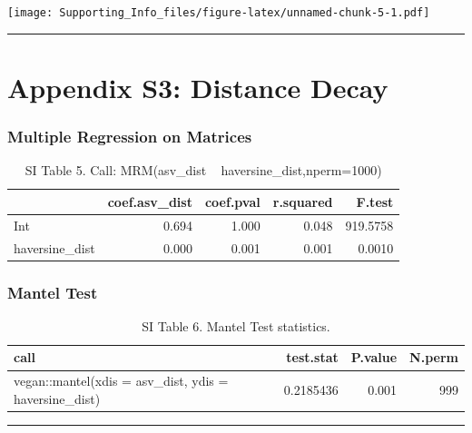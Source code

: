 \documentclass[
]{article}
\begin{document}
\texttt{[image: Supporting\_Info\_files/figure-latex/unnamed-chunk-5-1.pdf]}

\begin{center}\rule{0.5\linewidth}{0.5pt}\end{center}

\hypertarget{appendix-s3-distance-decay}{%
\section{Appendix S3: Distance Decay}\label{appendix-s3-distance-decay}}

\hypertarget{multiple-regression-on-matrices}{%
\subsubsection{Multiple Regression on
Matrices}\label{multiple-regression-on-matrices}}

\begin{table}

\caption{\label{tab:unnamed-chunk-6}SI Table 5. Call: MRM(asv_dist ~ haversine_dist,nperm=1000)}
\centering
\begin{tabular}[t]{l|r|r|r|r}
\hline
  & coef.asv\_dist & coef.pval & r.squared & F.test\\
\hline
Int & 0.694 & 1.000 & 0.048 & 919.5758\\
\hline
haversine\_dist & 0.000 & 0.001 & 0.001 & 0.0010\\
\hline
\end{tabular}
\end{table}

\hypertarget{mantel-test}{%
\subsubsection{Mantel Test}\label{mantel-test}}

\begin{table}

\caption{\label{tab:unnamed-chunk-7}SI Table 6. Mantel Test statistics.}
\centering
\begin{tabular}[t]{l|r|r|r}
\hline
call & test.stat & P.value & N.perm\\
\hline
vegan::mantel(xdis = asv\_dist, ydis = haversine\_dist) & 0.2185436 & 0.001 & 999\\
\hline
\end{tabular}
\end{table}

\begin{center}\rule{0.5\linewidth}{0.5pt}\end{center}
\end{document}
